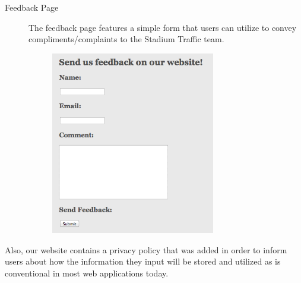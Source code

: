 \begin{description}
    \item[Feedback Page] The feedback page features a simple form that
  users can utilize to convey compliments/complaints to the Stadium
  Traffic team.

  \begin{figure}[htp]
    \centering
    \includegraphics[height=8cm]{graphics/website/feedback.png}
    \caption{}
  \end{figure}
\end{description}

Also, our website contains a privacy policy that was added in order to
inform users about how the information they input will be stored and
utilized as is conventional in most web applications today.
